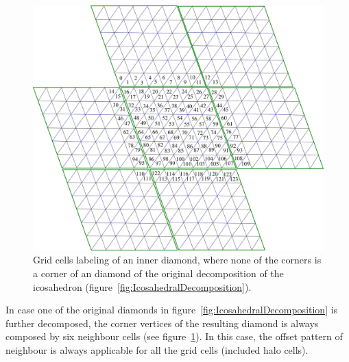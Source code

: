 \documentclass{book}
\begin{document}
\begin{figure}[htb!]
	\begin{center}
		\includegraphics[width=18cm]{fig/IcosahedralGridCellHalosInnerDiamond.png}
		\caption{Grid cells labeling of an inner diamond, where none 
			of the corners is a corner of an diamond of the original 
			decomposition of the icosahedron (figure~\ref{fig:IcosahedralDecomposition}).
		}
		\label{fig:IcosahedralDiamondWithHalosInnerDiamond}
	\end{center}
\end{figure}

In case one of the original diamonds in figure~\ref{fig:IcosahedralDecomposition} is further decomposed, the corner vertices
of the resulting diamond is always composed by six neighbour cells
(see figure~\ref{fig:IcosahedralDiamondWithHalosInnerDiamond}).
In this case, the offset pattern of neighbour is always applicable for all the grid cells (included halo cells).




{}
\end{document}
